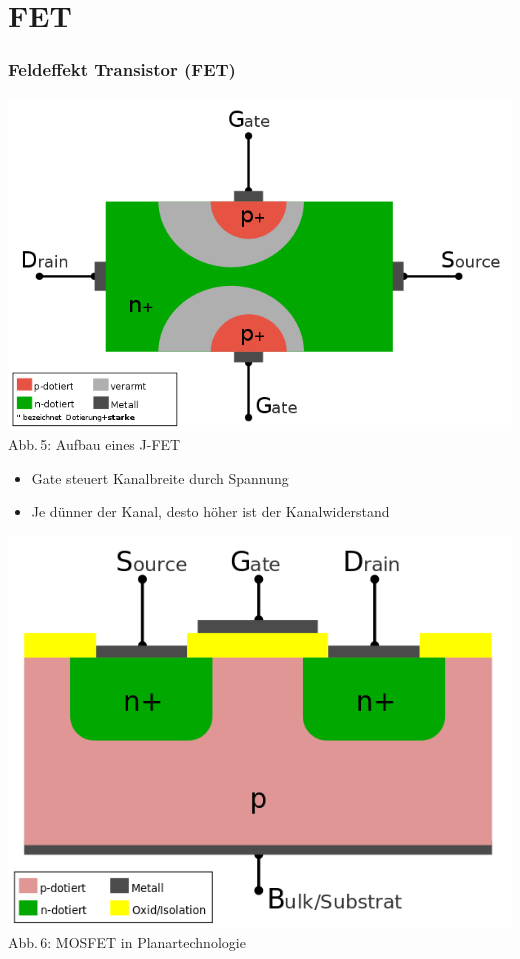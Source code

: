 \section*{FET}
\begin{frame}
\frametitle{Feldeffekt Transistor (FET)}
\begin{center}
	\includegraphics[width=\textwidth,height=.6\textheight,keepaspectratio]{a06/FET-aufbau.png}\\
	{\tiny Abb.\,5: Aufbau eines J-FET~\cite{wp}}
\begin{itemize}
	\item Gate steuert Kanalbreite durch Spannung
	\item Je dünner der Kanal, desto höher ist der Kanalwiderstand
\end{itemize}
\end{center}
\end{frame}

\begin{frame}
	\begin{center}
		\includegraphics[width=\textwidth,height=.85\textheight,keepaspectratio]{a06/Isolierschicht-FET-intern.png}\\
		{\tiny Abb.\,6: MOSFET in Planartechnologie~\cite{wmde}}
	\end{center}
\end{frame}

